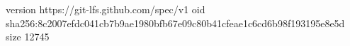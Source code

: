 version https://git-lfs.github.com/spec/v1
oid sha256:8c2007efdc041cb7b9ae1980bfb67e09c80b41cfeae1c6cd6b98f193195e8e5d
size 12745
